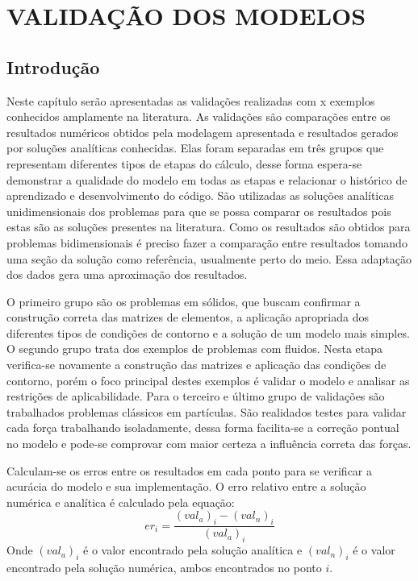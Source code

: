 \chapter{VALIDAÇÃO DOS MODELOS}
\label{validacao}
\section{\textbf{Introdução}}
Neste capítulo serão apresentadas as validações realizadas com x exemplos conhecidos amplamente na literatura.
As validações são comparações entre os resultados numéricos obtidos pela modelagem apresentada e resultados gerados por soluções analíticas conhecidas. Elas foram separadas em três grupos que representam diferentes tipos de etapas do cálculo, desse forma espera-se demonstrar a qualidade do modelo em todas as etapas e relacionar o histórico de aprendizado e desenvolvimento do código.
São utilizadas as soluções analíticas unidimensionais dos problemas para que se possa comparar os resultados pois estas são as soluções presentes na literatura. Como os resultados são obtidos para problemas bidimensionais é preciso fazer a comparação entre resultados tomando uma seção da solução como referência, usualmente perto do meio. Essa adaptação dos dados gera uma aproximação dos resultados.

O primeiro grupo são os problemas em sólidos, que buscam confirmar a construção correta das matrizes de elementos, a aplicação apropriada dos diferentes tipos de condições de contorno e a solução de um modelo mais simples.
O segundo grupo trata dos exemplos de problemas com fluidos. 
Nesta etapa verifica-se novamente a construção das matrizes e aplicação das condições de contorno, 
porém o foco principal destes exemplos é validar o modelo e analisar as restrições de aplicabilidade.
Para o terceiro e último grupo de validações são trabalhados problemas clássicos em partículas.
São realidados testes para validar cada força trabalhando isoladamente, dessa forma facilita-se a correção pontual no modelo e pode-se comprovar com maior certeza a influência correta das forças.

Calculam-se os erros entre os resultados em cada ponto para se verificar a acurácia do modelo e sua implementação.
O erro relativo entre a solução numérica e analítica é calculado pela equação:
\begin{equation}
    er_i = \frac{(val_a)_i - (val_n)_i}{(val_a)_i}
    \label{error_eq} 
\end{equation}
Onde $(val_a)_i$ é o valor encontrado pela solução analítica e $(val_n)_i$ é o valor encontrado pela solução numérica, ambos encontrados no ponto $i$.

